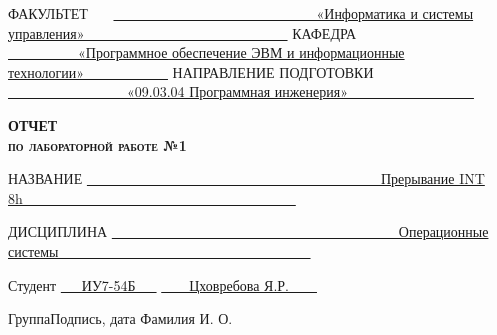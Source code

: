 \documentclass[a4paper,14pt]{article}
\begin{document}
\begin{titlepage}
	\noindent ФАКУЛЬТЕТ~~~ \underline{~~~~~~~~~~~~~~~~~~~~~~~~~~~~~«Информатика и системы управления»~~~~~~~~~~~~~~~~~~~~~~~~~~~~~} \newline\newline
	\noindent КАФЕДРА~~~~~~~ \underline{~~~~~~~~~~«Программное обеспечение ЭВМ и информационные технологии»~~~~~~~~~~~~} \newline\newline
	\noindent НАПРАВЛЕНИЕ ПОДГОТОВКИ~~~ \underline{~~~~~~~~~~~~~~~~~«09.03.04 Программная инженерия»~~~~~~~~~~~~~~~~~~} \newline\newline
	
	\vspace{2.5cm}
	
	\begin{center}
		\Large\textbf{\textsc{ОТЧЕТ}}\\
		\Large\textbf{\textsc{по лабораторной работе №1}}\\
	\end{center}
	
	\vspace{1cm}
	
	\noindent\textnormal{НАЗВАНИЕ} \hspace{10mm} \underline{\textnormal{~~~~~~~~~~~~~~~~~~~~~~~~~~~~~~~~~~~~~~~~~~Прерывание INT 8h~~~~~~~~~~~~~~~~~~~~~~~~~~~~~~~~~~~~~~~}}\noindent

	\vspace{1.3cm}
	
	\noindent\textnormal{ДИСЦИПЛИНА} \hspace{3mm} \underline{\textnormal{~~~~~~~~~~~~~~~~~~~~~~~~~~~~~~~~~~~~~~~~~Операционные системы~~~~~~~~~~~~~~~~~~~~~~~~~~~~~~~~~~~~}}\noindent
	
	\vspace{2cm}
	
	\noindent\textnormal{Студент} \hspace{25mm}
	\underline{\textnormal{{~~~ИУ7-54Б~~~}}}
	\hspace{17mm}
	\underline{\textnormal{\hphantom{~~~~~~~~~~~~~~~~~~~~~~~~~~~~~~~~}}} \hspace{6mm}
	\underline{\textnormal{~~~~Цховребова Я.Р.~~~~}}
	
	\vspace{2mm}
	
	\noindent\textnormal{\hphantom{Студент}} \hspace{30mm}\noindent
	\fontsize{8pt}{8pt}
	\textnormal{Группа}\hspace{35mm}\textnormal{Подпись, дата} \hspace{22mm}\noindent\textnormal{Фамилия И. О.}
	

\end{titlepage}
\end{document}
